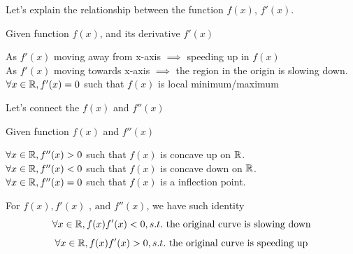 Let's explain the relationship between the function $f(x)$, $f'(x)$. \\
\begin{proposition}
    Given function $f(x)$, and its derivative $f'(x)$

    \begin{center}
        As $f'(x)$ moving away from x-axis $\implies$ speeding up in $f(x)$\\
        As $f'(x)$ moving towards x-axis $\implies$ the region in the origin is slowing down. \\
         $\forall x \in \mathbb{R}, f'(x) = 0$ such that $f(x)$ is local minimum/maximum 
    \end{center}
\end{proposition}

Let's connect the $f(x)$ and $f''(x)$
\begin{proposition}
    Given function $f(x)$ and $f''(x)$

    \begin{center}
        $\forall x \in \mathbb{R}, f''(x) > 0$ such that $f(x)$ is concave up on $\mathbb{R}$.\\
        $\forall x \in \mathbb{R}, f''(x) < 0$ such that $f(x)$ is concave down on $\mathbb{R}$.\\
        $\forall x \in \mathbb{R}, f''(x) = 0$ such that $f(x)$ is a inflection point. \\
    \end{center}
\end{proposition}

For $f(x), f'(x)\text{ , and } f''(x)$, we have such identity
$$\forall x \in \mathbb{R}, f(x)f'(x) < 0, s.t. \text{ the original curve is slowing down}$$
$$\forall x \in \mathbb{R}, f(x)f'(x) > 0, s.t. \text{ the original curve is speeding up}$$